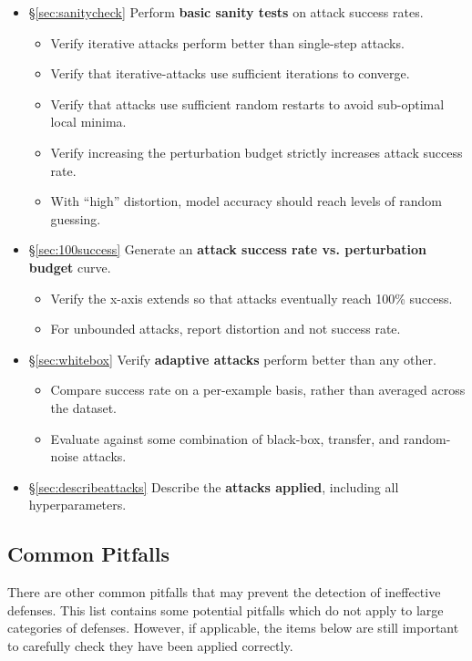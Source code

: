 \documentclass{article} %
\begin{document}
\begin{itemize}[leftmargin=*]
\begin{itemize}[leftmargin=*]
  \end{itemize}
\item \S\ref{sec:sanitycheck} Perform \textbf{basic sanity tests} on attack success rates.
  \begin{itemize}[leftmargin=*]
    \item Verify iterative attacks perform better than single-step attacks.
    \item Verify that iterative-attacks use sufficient iterations to converge. 
    \item Verify that attacks use sufficient random restarts to avoid sub-optimal local minima.
    \item Verify increasing the perturbation budget strictly increases attack success rate.
    \item With ``high'' distortion, model accuracy should reach levels of random guessing.%
  \end{itemize}
\item \S\ref{sec:100success} Generate an \textbf{attack success rate vs. perturbation budget} curve.
  \begin{itemize}[leftmargin=*]
  \item Verify the x-axis extends so that attacks eventually reach 100\% success.
  \item For unbounded attacks, report distortion and not success rate.
  \end{itemize}
\item \S\ref{sec:whitebox} Verify \textbf{adaptive attacks} perform better than any other.
  \begin{itemize}[leftmargin=*]
  \item Compare success rate on a per-example basis, rather than averaged across the dataset.
  \item Evaluate against some combination of black-box, transfer, and random-noise attacks.
  \end{itemize}
\item \S\ref{sec:describeattacks} Describe the \textbf{attacks applied}, including all hyperparameters.

\end{itemize}

\subsection{Common Pitfalls}
There are other common pitfalls that may prevent the detection of ineffective defenses.
%
This list contains some potential pitfalls which do not apply to
large categories of defenses.
%
However, if applicable, the items below are still important to carefully
check they have been applied correctly.
%
\end{document}
